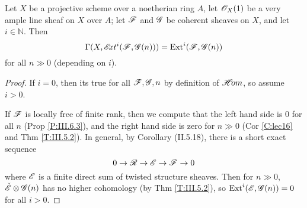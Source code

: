  \begin{proposition}[III.6.9] Let $X$ be a projective scheme over a
 noetherian ring $A$, let $\mathscr{O}_X(1)$ be a very ample line sheaf on
 $X$ over $A$; let $\mathscr{F}$ and $\mathscr{G}$ be coherent sheaves on $X$, and
 let $i\in \mathbb{N}$.  Then
 \[
    \Gamma(X,\mathscr{E}\!xt^i(\mathscr{F},\mathscr{G}(n))) = \text{\rm Ext}^i(\mathscr{F},\mathscr{G}(n))
 \]
 for all $n\gg 0$ (depending on $i$).
 \end{proposition}
 \begin{proof}
 If $i=0$, then its true for all $\mathscr{F},\mathscr{G},n$ by definition of
 $\mathscr{H}\!om$, so assume $i>0$.

 If $\mathscr{F}$ is locally free of finite rank, then we compute that the
 left hand side is 0 for all $n$ (Prop \ref{P:III.6.3}), and the right hand side
 is zero for $n\gg 0$ (Cor \ref{C:lec16} and Thm \ref{T:III.5.2}).
  In general, by Corollary (II.5.18), there is a short exact sequence
  \[
    0\to \mathscr{R} \to \mathscr{E}\to \mathscr{F}\to 0
  \]
  where $\mathscr{E}$ is a finite direct sum of twisted structure sheaves.
  Then for $n\gg 0$, $\check {\mathscr{E}} \otimes \mathscr{G}(n)$ has no higher
  cohomology (by Thm \ref{T:III.5.2}), so $\text{\rm Ext}^i(\mathscr{E},\mathscr{G}(n))=0$ for all $i>0$.
 \end{proof}
